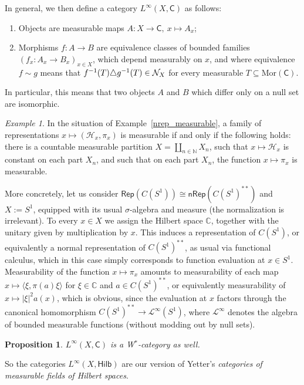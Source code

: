 \documentclass[reqno,T1]{amsproc}
\renewcommand{\H}{\mathcal{H}}	%
\newcommand{\N}{\mathbb{N}}
\newcommand{\C}{\mathbb{C}}
\newcommand{\cat}[1]{\mathsf{#1}}		%
\newcommand{\Hilb}{\mathsf{Hilb}} 		%
\newcommand{\Rep}[1]{\mathsf{Rep}(#1)}		%
\newcommand{\NRep}[1]{\mathsf{nRep}(#1)}	%
\newcommand{\Mor}[1]{\mathrm{Mor}(#1)}	%
\theoremstyle{plain}
\newtheorem{prop}[thm]{Proposition}
\theoremstyle{remark}
\newtheorem{ex}[thm]{Example}
\numberwithin{equation}{section}
\begin{document}
In general, we then define a category $L^\infty(X,\cat{C})$ as follows:

\begin{enumerate}
\item Objects are measurable maps $A : X \to \cat{C}, \: x\mapsto A_x$;
\item Morphisms $f : A\to B$ are equivalence classes of bounded families $(f_x : A_x\to B_x)_{x\in X}$, which depend measurably on $x$, and where equivalence $f \sim g$ means that $f^{-1}(T) \triangle g^{-1}(T) \in \mathcal{N}_X$ for every measurable $T \subseteq \Mor{\cat{C}}$.
\end{enumerate}

In particular, this means that two objects $A$ and $B$ which differ only on a null set are isomorphic.

\begin{ex}
In the situation of Example~\ref{nrep_measurable}, a family of representations $x \mapsto (\H_x,\pi_x)$ is measurable if and only if the following holds: there is a countable measurable partition $X = \coprod_{n\in\N} X_n$, such that $x\mapsto \H_x$ is constant on each part $X_n$, and such that on each part $X_n$, the function $x \mapsto \pi_x$ is measurable.

More concretely, let us consider $\Rep{C(S^1)} \cong \NRep{C(S^1)^{**}}$ and $X := S^1$, equipped with its usual $\sigma$-algebra and measure (the normalization is irrelevant). To every $x\in X$ we assign the Hilbert space $\C$, together with the unitary given by multiplication by $x$. This induces a representation of $C(S^1)$, or equivalently a normal representation of $C(S^1)^{**}$, as usual via functional calculus, which in this case simply corresponds to function evaluation at $x\in S^1$. Measurability of the function $x\mapsto \pi_x$ amounts to measurability of each map $x\mapsto \langle\xi,\pi(a)\xi\rangle$ for $\xi\in\C$ and $a\in C(S^1)^{**}$, or equivalently measurability of $x\mapsto |\xi|^2 a(x)$, which is obvious, since the evaluation at $x$ factors through the canonical homomorphism $C(S^1)^{**} \to \mathcal{L}^\infty(S^1)$, where $\mathcal{L}^\infty$ denotes the algebra of bounded measurable functions (without modding out by null sets).
\end{ex}

\begin{prop}
$L^\infty(X,\cat{C})$ is a W$^*$-category as well.
\end{prop}

So the categories $L^\infty(X,\Hilb)$ are our version of Yetter's \emph{categories of measurable fields of Hilbert spaces}.
\end{document}
